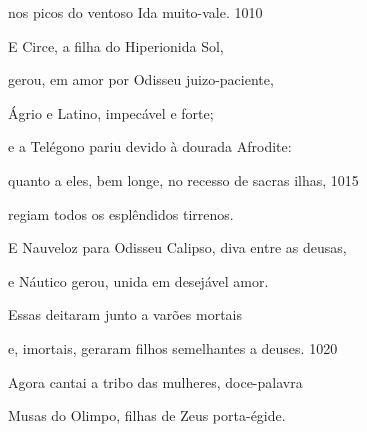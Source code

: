 nos picos do ventoso Ida muito-vale. \num{1010}

\quad{}E Circe, a filha do Hiperionida Sol,

gerou, em amor por Odisseu juizo-paciente,

Ágrio e Latino, impecável e forte;

e a Telégono pariu devido à dourada Afrodite:

quanto a eles, bem longe, no recesso de sacras ilhas, \num{1015}

regiam todos os esplêndidos tirrenos.

\quad{}E Nauveloz para Odisseu Calipso, diva entre as deusas,

e Náutico gerou, unida em desejável amor.

\quad{}Essas deitaram junto a varões mortais

e, imortais, geraram filhos semelhantes a deuses. \num{1020}

Agora cantai a tribo das mulheres, doce-palavra

Musas do Olimpo, filhas de Zeus porta-égide.

\endgroup